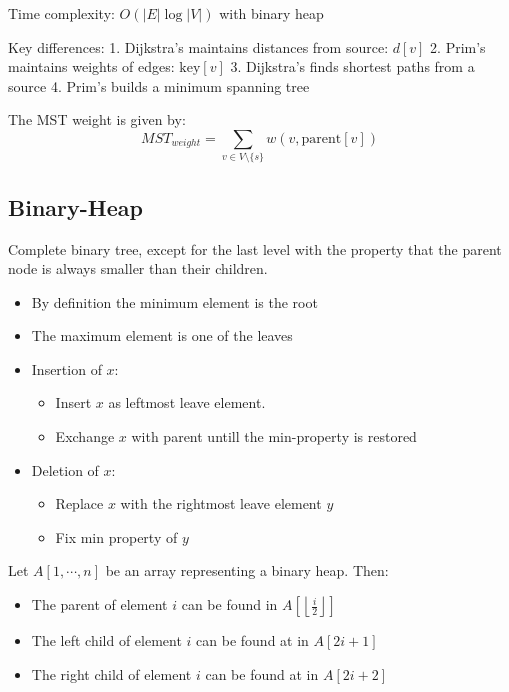 Time complexity: \( O(|E|\log|V|) \) with binary heap

Key differences:
1. Dijkstra's maintains distances from source: \( d[v] \)
2. Prim's maintains weights of edges: \( \text{key}[v] \)
3. Dijkstra's finds shortest paths from a source
4. Prim's builds a minimum spanning tree

The MST weight is given by:
\begin{equation*}
    MST_{weight} = \sum_{v \in V \setminus \{s\}} w(v, \text{parent}[v])
\end{equation*}

\subsection{Binary-Heap}
Complete binary tree, except for the last level with the property that the parent node is always smaller than their children.
\begin{itemize}
    \item By definition the minimum element is the root
    \item The maximum element is one of the leaves
    \item Insertion of \( x \):
        \begin{itemize}
            \item Insert \( x \) as leftmost leave element.
            \item Exchange \( x \) with parent untill the min-property is restored
        \end{itemize}
    \item Deletion of \( x \):
        \begin{itemize}
            \item Replace \( x \) with the rightmost leave element \( y \)
            \item Fix min property of \( y \)
        \end{itemize}
\end{itemize}

Let \( A[1, \cdots,  n] \) be an array representing a binary heap. Then:
\begin{itemize}
    \item The parent of element \( i \) can be found in \( A \left[ \left\lfloor \frac{i}{2}  \right\rfloor \right] \)
    \item The left child of element \( i \) can be found at in \( A \left[ 2i + 1 \right] \)
    \item The right child of element \( i \) can be found at in \( A \left[ 2i + 2 \right] \)
\end{itemize}

